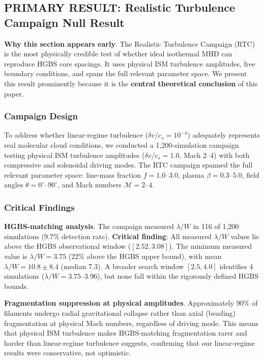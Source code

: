 \documentclass[twocolumn]{mnras}
\begin{document}
\subsection{PRIMARY RESULT: Realistic Turbulence Campaign Null Result}
\label{sec:rtc}

\textbf{Why this section appears early}. The Realistic Turbulence Campaign (RTC) is the most physically credible test of whether ideal isothermal MHD can reproduce HGBS core spacings. It uses physical ISM turbulence amplitudes, free boundary conditions, and spans the full relevant parameter space. We present this result prominently because it is the \textbf{central theoretical conclusion} of this paper.

\subsubsection{Campaign Design}

To address whether linear-regime turbulence ($\delta v/c_s = 10^{-4}$) adequately represents real molecular cloud conditions, we conducted a 1,200-simulation campaign testing physical ISM turbulence amplitudes ($\delta v/c_s = 1.0$, Mach 2--4) with both compressive and solenoidal driving modes. The RTC campaign spanned the full relevant parameter space: line-mass fraction $f = 1.0$--$3.0$, plasma $\beta = 0.3$--$5.0$, field angles $\theta = 0^{\circ}$--$90^{\circ}$, and Mach numbers $\mathcal{M} = 2$--$4$.

\subsubsection{Critical Findings}

\textbf{HGBS-matching analysis}. The campaign measured $\lambda/W$ in 116 of 1,200 simulations (9.7\% detection rate). \textbf{Critical finding}: All measured $\lambda/W$ values lie above the HGBS observational window ($[2.52, 3.08]$). The minimum measured value is $\lambda/W = 3.75$ (22\% above the HGBS upper bound), with mean $\lambda/W = 10.8 \pm 8.4$ (median 7.3). A broader search window $[2.5, 4.0]$ identifies 4 simulations ($\lambda/W = 3.75$--$3.96$), but none fall within the rigorously defined HGBS bounds.

\textbf{Fragmentation suppression at physical amplitudes}. Approximately 90\% of filaments undergo radial gravitational collapse rather than axial (beading) fragmentation at physical Mach numbers, regardless of driving mode. This means that physical ISM turbulence makes HGBS-matching fragmentation rarer and harder than linear-regime turbulence suggests, confirming that our linear-regime results were conservative, not optimistic.
\end{document}
